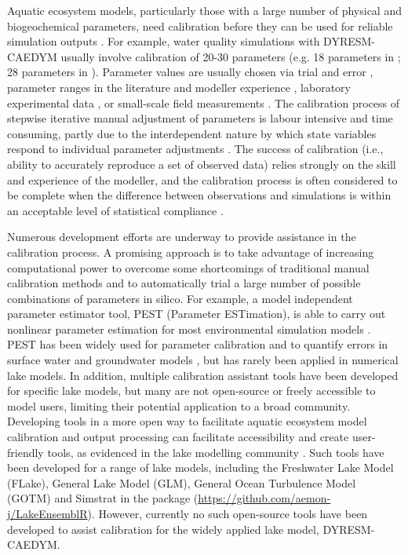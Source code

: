 Aquatic ecosystem models, particularly those with a large number of physical and biogeochemical parameters, need calibration before they can be used for reliable simulation outputs \citep{luo2018autocalibration}. For example, water quality simulations with DYRESM-CAEDYM usually involve calibration of 20-30 parameters (e.g. 18 parameters in \citet{luo2018autocalibration}; 28 parameters in \citet{schladow1997prediction}). Parameter values are usually chosen via trial and error \citep{takkouk2016application}, parameter ranges in the literature and modeller experience \citep{lehmann2018modelling,robson2004three}, laboratory experimental data \citep{robson2003summer}, or small-scale field measurements \citep{burger2008modelling}. The calibration process of stepwise iterative manual adjustment of parameters is labour intensive and time consuming, partly due to the interdependent nature by which state variables respond to individual parameter adjustments \citep{lehmann2018modelling}. The success of calibration (i.e., ability to accurately reproduce a set of observed data) relies strongly on the skill and experience of the modeller, and the calibration process is often considered to be complete when the difference between observations and simulations is within an acceptable level of statistical compliance \citep{hipsey2020system}.\par

Numerous development efforts are underway to provide assistance in the calibration process. A promising approach is to take advantage of increasing computational power to overcome some shortcomings of traditional manual calibration methods and to automatically trial a large number of possible combinations of parameters in silico. For example, a model independent parameter estimator tool, PEST (Parameter ESTimation), is able to carry out nonlinear parameter estimation for most environmental simulation models \citep{doherty1994pest,doherty2018model}. PEST has been widely used for parameter calibration and to quantify errors in surface water and groundwater models \citep{christensen2008predictive,gallagher2007predictive,white2014quantifying}, but has rarely been applied in numerical lake models. In addition, multiple calibration assistant tools have been developed for specific lake models, but many are not open-source or freely accessible to model users, limiting their potential application to a broad community. Developing tools in a more open way to facilitate aquatic ecosystem model calibration and output processing can facilitate accessibility and create user-friendly tools, as evidenced in the lake modelling community \citep{frassl2019short}. Such tools have been developed for a range of lake models, including the Freshwater Lake Model (FLake), General Lake Model (GLM), General Ocean Turbulence Model (GOTM) and Simstrat in the  package (\url{https://github.com/aemon-j/LakeEnsemblR}). However, currently no such open-source tools have been developed to assist calibration for the widely applied lake model, DYRESM-CAEDYM. \par

